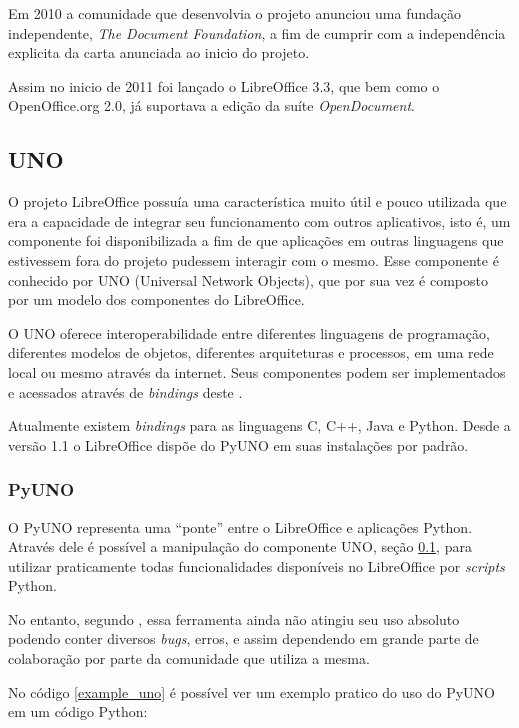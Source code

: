 Em 2010 a comunidade que desenvolvia o projeto anunciou uma fundação independente, \textit{The Document Foundation}, a fim de cumprir com a independência explicita da carta anunciada ao inicio do projeto.

Assim no inicio de 2011 foi lançado o LibreOffice 3.3, que bem como o OpenOffice.org 2.0, já suportava a edição da suíte \textit{OpenDocument}.


\subsection{UNO}
\label{uno}

O projeto LibreOffice possuía uma característica muito útil e pouco utilizada que era a capacidade de integrar seu funcionamento com outros aplicativos, isto é, um componente foi disponibilizada a fim de que aplicações em outras linguagens que estivessem fora do projeto pudessem interagir com o mesmo. Esse componente é conhecido por UNO (Universal Network Objects), que por sua vez é composto por um modelo dos componentes do LibreOffice.

O UNO oferece interoperabilidade entre diferentes linguagens de programação, diferentes modelos de objetos, diferentes arquiteturas e processos, em uma rede local ou mesmo através da internet. Seus componentes podem ser implementados e acessados através de \textit{bindings} deste \cite{MINETTO-PYUNO}.

Atualmente existem \textit{bindings} para as linguagens C, C++, Java e Python. Desde a versão 1.1 o LibreOffice dispõe do PyUNO em suas instalações por padrão.

\subsubsection{PyUNO}
\label{pyuno}

O PyUNO representa uma ``ponte'' entre o LibreOffice e aplicações Python. Através dele é possível a manipulação do componente UNO, seção \ref{uno}, para utilizar praticamente todas funcionalidades disponíveis no LibreOffice por \textit{scripts} Python.

No entanto, segundo \cite{PYUNO}, essa ferramenta ainda não atingiu seu uso absoluto podendo conter diversos \textit{bugs}, erros, e assim dependendo em grande parte de colaboração por parte da comunidade que utiliza a mesma.

No código \ref{example_uno} é possível ver um exemplo pratico do uso do PyUNO em um código Python:


